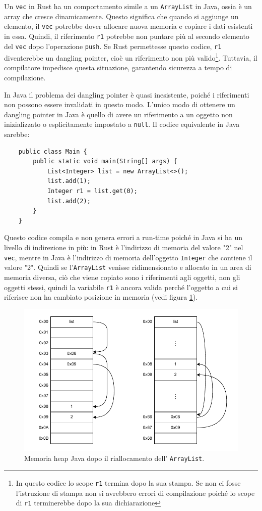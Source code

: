 Un \texttt{vec} in Rust ha un comportamento simile a un \texttt{ArrayList} in Java, ossia è un array che cresce dinamicamente. Questo significa che quando si aggiunge un elemento, il \texttt{vec} potrebbe dover allocare nuova memoria e copiare i dati esistenti in essa. Quindi, il riferimento \texttt{r1} potrebbe non puntare più al secondo elemento del \texttt{vec} dopo l'operazione \texttt{push}. Se Rust permettesse questo codice, \texttt{r1} diventerebbe un dangling pointer, cioè un riferimento non più valido\footnote{In questo codice lo scope \texttt{r1} termina dopo la sua stampa. Se non ci fosse l'istruzione di stampa non si avrebbero errori di compilazione poiché lo scope di \texttt{r1} terminerebbe dopo la sua dichiarazione}.
 Tuttavia, il compilatore impedisce questa situazione, garantendo sicurezza a tempo di compilazione.

In Java il problema dei dangling pointer è quasi inesistente, poiché i riferimenti non possono essere invalidati in questo modo. L'unico modo di ottenere un dangling pointer in Java è quello di avere un riferimento a un oggetto non inizializzato o esplicitamente impostato a \texttt{null}. Il codice equivalente in Java sarebbe:
\begin{verbatim}
    public class Main {
        public static void main(String[] args) {
            List<Integer> list = new ArrayList<>();
            list.add(1);
            Integer r1 = list.get(0);
            list.add(2);
        }
    }
\end{verbatim}
Questo codice compila e non genera errori a run-time poiché in Java si ha un livello di indirezione in più:  in Rust è l'indirizzo di memoria del valore "2" nel \texttt{vec}, mentre in Java è l'indirizzo di memoria dell'oggetto \texttt{Integer} che contiene il valore "2". Quindi se l'\texttt{ArrayList} venisse ridimensionato e allocato in un area di memoria diversa, ciò che viene copiato sono i riferimenti agli oggetti, non gli oggetti stessi, quindi la variabile \texttt{r1} è ancora valida perché l'oggetto a cui si riferisce non ha cambiato posizione in memoria (vedi figura \ref{fig:bor3}). 
\begin{figure}[H]
    \centering
    \includegraphics[width = \textwidth]{Figures/bor3.drawio.pdf}
    \caption{Memoria heap Java dopo il riallocamento dell' \texttt{ArrayList}.}
    \label{fig:bor3}
\end{figure}
